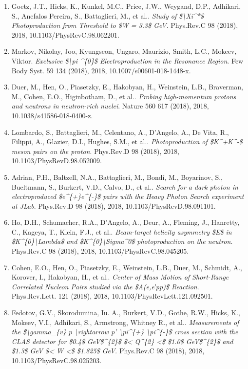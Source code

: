 \begin{enumerate}
\item Goetz, J.T., Hicks, K., Kunkel, M.C., Price, J.W., Weygand, D.P., Adhikari, S., Anefalos Pereira, S., Battaglieri, M., et al.. \textit{Study of \$\textbackslash{}Xi\textasciicircum{}*\$ Photoproduction from Threshold to \$W = 3.3\$ GeV}. Phys.Rev.C 98 (2018), 2018, 10.1103/PhysRevC.98.062201.
\item Markov, Nikolay, Joo, Kyungseon, Ungaro, Maurizio, Smith, L.C., Mokeev, Viktor. \textit{Exclusive \$\textbackslash{}pi \textasciicircum{}\{0\}\$ Electroproduction in the Resonance Region}. Few Body Syst. 59 134 (2018), 2018, 10.1007/s00601-018-1448-x.
\item Duer, M., Hen, O., Piasetzky, E., Hakobyan, H., Weinstein, L.B., Braverman, M., Cohen, E.O., Higinbotham, D., et al.. \textit{Probing high-momentum protons and neutrons in neutron-rich nuclei}. Nature 560 617 (2018), 2018, 10.1038/s41586-018-0400-z.
\item Lombardo, S., Battaglieri, M., Celentano, A., D'Angelo, A., De Vita, R., Filippi, A., Glazier, D.I., Hughes, S.M., et al.. \textit{Photoproduction of \$K\textasciicircum{}+K\textasciicircum{}-\$ meson pairs on the proton}. Phys.Rev.D 98 (2018), 2018, 10.1103/PhysRevD.98.052009.
\item Adrian, P.H., Baltzell, N.A., Battaglieri, M., Bondí, M., Boyarinov, S., Bueltmann, S., Burkert, V.D., Calvo, D., et al.. \textit{Search for a dark photon in electroproduced \$e\textasciicircum{}\{+\}e\textasciicircum{}\{-\}\$ pairs with the Heavy Photon Search experiment at JLab}. Phys.Rev.D 98 (2018), 2018, 10.1103/PhysRevD.98.091101.
\item Ho, D.H., Schumacher, R.A., D'Angelo, A., Deur, A., Fleming, J., Hanretty, C., Kageya, T., Klein, F.J., et al.. \textit{Beam-target helicity asymmetry \$E\$ in \$K\textasciicircum{}\{0\}\textbackslash{}Lambda\$ and \$K\textasciicircum{}\{0\}\textbackslash{}Sigma\textasciicircum{}0\$  photoproduction on the neutron}. Phys.Rev.C 98 (2018), 2018, 10.1103/PhysRevC.98.045205.
\item Cohen, E.O., Hen, O., Piasetzky, E., Weinstein, L.B., Duer, M., Schmidt, A., Korover, I., Hakobyan, H., et al.. \textit{Center of Mass Motion of Short-Range Correlated Nucleon Pairs studied via the \$A(e,e′pp)\$ Reaction}. Phys.Rev.Lett. 121 (2018), 2018, 10.1103/PhysRevLett.121.092501.
\item Fedotov, G.V., Skorodumina, Iu. A., Burkert, V.D., Gothe, R.W., Hicks, K., Mokeev, V.I., Adhikari, S., Armstrong, Whitney R., et al.. \textit{Measurements of the \$\textbackslash{}gamma\_\{v\} p \textbackslash{}rightarrow p' \textbackslash{}pi\textasciicircum{}\{+\} \textbackslash{}pi\textasciicircum{}\{-\}\$ cross section with the CLAS detector for \$0.4\$ GeV\$\textasciicircum{}\{2\}\$ \$< Q\textasciicircum{}\{2\} <\$ \$1.0\$ GeV\$\textasciicircum{}\{2\}\$ and \$1.3\$ GeV \$< W <\$ \$1.825\$ GeV}. Phys.Rev.C 98 (2018), 2018, 10.1103/PhysRevC.98.025203.

\end{enumerate}
